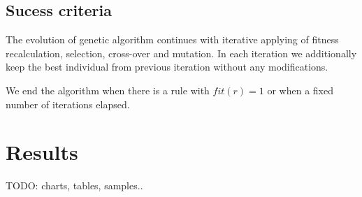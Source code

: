 \documentclass[12pt,a4paper]{article}
\begin{document}
\subsection{Sucess criteria}

The evolution of genetic algorithm continues with iterative applying of fitness recalculation, selection, cross-over and mutation. In each iteration we additionally keep the best individual from previous iteration without any modifications.

We end the algorithm when there is a rule with $fit(r)=1$ or when a fixed number of iterations elapsed. 

\section{Results}

TODO: charts, tables, samples..
\end{document}
